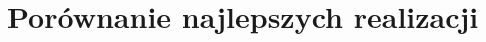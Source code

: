 \chapter{Porównanie najlepszych realizacji}


\begin{figure}[H]
\centering

\end{figure}

\begin{figure}[H]
\centering

\end{figure}

\begin{figure}[H]
\centering

\end{figure}


\begin{figure}[H]
\centering

\end{figure}


\begin{figure}[H]
\centering

\end{figure}



